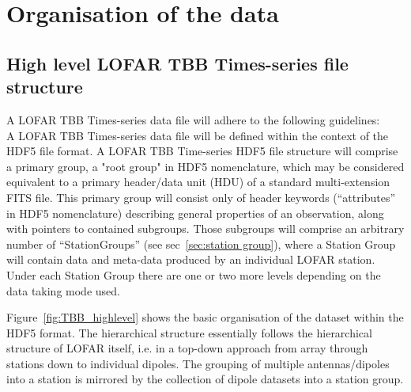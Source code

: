 \documentclass[a4paper,10pt,bibtotoc]{scrartcl}
\begin{document}

\clearpage

\section{Organisation of the data}
\label{sec:structure}

\subsection{High level LOFAR TBB Times-series file structure}

A LOFAR TBB Times-series data file will adhere to the following guidelines:\\

A LOFAR TBB Times-series data file will be defined within the context
of the HDF5 file format.  A LOFAR TBB Time-series HDF5 file structure
will comprise a primary group, a "root group" in HDF5 nomenclature,
which may be considered equivalent to a primary header/data unit (HDU)
of a standard multi-extension FITS file.  This primary group will
consist only of header keywords (“attributes” in HDF5 nomenclature)
describing general properties of an observation, along with pointers
to contained subgroups.  Those subgroups will comprise an arbitrary
number of ``StationGroups'' (see sec~\ref{sec:station group}), where a
Station Group will contain data and meta-data produced by an
individual LOFAR station. Under each Station Group there are one or two more levels
depending on the data taking mode used.

Figure~\ref{fig:TBB_highlevel} shows the basic organisation of the dataset within
the HDF5 format. The hierarchical structure essentially follows the
hierarchical structure of LOFAR itself, i.e. in a top-down approach
from array through stations down to individual dipoles. The grouping
of multiple antennas/dipoles into a station is mirrored by the
collection of dipole datasets into a station group.
\end{document}
